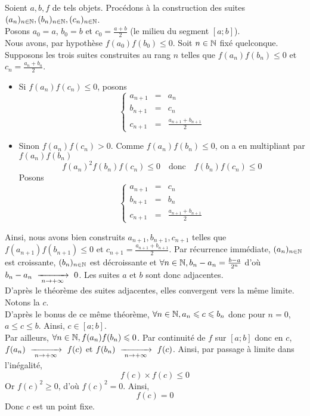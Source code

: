 \documentclass{article}
\renewenvironment{question_kholle}[2][ ]
{
	\subsection{\texorpdfstring{#2}{}}
	\notblank{#1}
	{
		\noindent #1
		\bigbreak
	}
	{}
	\begin{proof}
}
{
	\end{proof}
}
\begin{document}
\begin{question_kholle}
	\noindent Soient $a,b,f$ de tels objets. Procédons à la construction des suites $(a_n)_{n\in\mathbb N}, (b_n)_{n\in\mathbb N}, (c_n)_{n\in\mathbb N}$.\\
	Posons $a_0 = a$, $b_0 = b$ et $c_0 = \frac{a+b}{2}$ (le milieu du segment $[a;b]$).\\
	Nous avons, par hypothèse $f(a_0)f(b_0) \leqslant 0$.
	Soit $n \in \mathbb N$ fixé quelconque.\\
	Supposons les trois suites construites au rang $n$ telles que $f(a_n)f(b_n) \leqslant 0$ et $c_n = \frac{a_n+b_n}{2}$.
	\begin{itemize}
		\item Si $f(a_n)f(c_n) \leqslant 0$, posons $$\left\{ \begin{array}{lcl}
				      a_{n+1} & = & a_n                       \\
				      b_{n+1} & = & c_n                       \\
				      c_{n+1} & = & \frac{a_{n+1}+b_{n+1}}{2}
			      \end{array} \right.$$
		\item Sinon $f(a_n)f(c_n) > 0$. Comme $f(a_n)f(b_n) \leqslant 0$, on a en multipliant par $f(a_{n})f(b_{n})$ $$f(a_n)^2 f(b_n) f(c_n) \leqslant 0 \quad \text{donc}\quad f(b_n)f(c_n) \leqslant 0$$
		      Posons $$\left\{ \begin{array}{lcl}
				      a_{n+1} & = & c_n                       \\
				      b_{n+1} & = & b_n                       \\
				      c_{n+1} & = & \frac{a_{n+1}+b_{n+1}}{2}
			      \end{array} \right.$$
	\end{itemize}
	Ainsi, nous avons bien construits $a_{n+1}, b_{n+1}, c_{n+1}$ telles que $f(a_{n+1})f(b_{n+1}) \leqslant 0$ et ${ c_{n+1} = \frac{a_{n+1}+b_{n+1}}{2} }$.
	Par récurrence immédiate, $(a_n)_{n\in\mathbb N}$ est croissante, $(b_n)_{n\in\mathbb N}$ est décroissante et ${ \forall n \in \mathbb N, b_n - a_n = \frac{b-a}{2^n} }$ d'où $b_n - a_n \ \xrightarrow[\;n \to +\infty\;]{}\  0$.
	Les suites $a$ et $b$ sont donc adjacentes.\\
	D'après le théorème des suites adjacentes, elles convergent vers la même limite. Notons la $c$.\\
	D'après le bonus de ce même théorème, $\forall n \in \mathbb N, a_n \leqslant c \leqslant b_n$ donc pour $n = 0$, $a \leqslant c \leqslant b$. Ainsi, $c \in [a;b]$.\\
	Par ailleurs, $\forall n \in \mathbb N, f(a_n)f(b_n) \leqslant 0$. Par continuité de $f$ sur $[a;b]$ donc en $c$, $f(a_n) \ \xrightarrow[\;n \to +\infty\;]{}\  f(c)$ et $f(b_n) \ \xrightarrow[\;n \to +\infty\;]{}\  f(c)$. Ainsi, par passage à limite dans l'inégalité,
	\begin{equation*}
		f(c) \times f(c) \leqslant 0
	\end{equation*}
	Or $f(c)^2 \geqslant 0$, d'où $f(c)^2 = 0$. Ainsi,
	\begin{equation*}
		f(c) = 0
	\end{equation*}
	Donc $c$ est un point fixe.

\end{question_kholle}
\end{document}
